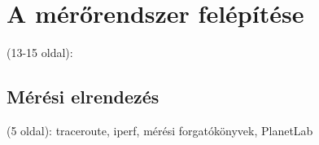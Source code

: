 \chapter{A mérőrendszer felépítése}
(13-15 oldal): 


\section{Mérési elrendezés}
(5 oldal): traceroute, iperf, mérési forgatókönyvek, PlanetLab

